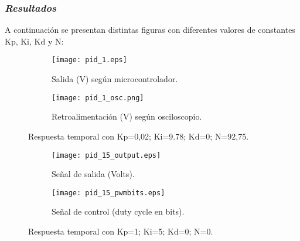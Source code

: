 \subsubsection*{\it{Resultados}}
\vspace{-0.25cm}

A continuación se presentan distintas figuras con diferentes valores de constantes Kp, Ki, Kd y N:

\begin{figure}[H]
    \centering

    \begin{subfigure}[b]{0.49\textwidth}
        \centering
        \texttt{[image: pid\_1.eps]}
        \caption{Salida (V) según microcontrolador.}
        \label{fig:pid1_micro}
    \end{subfigure}
    \begin{subfigure}[b]{0.49\textwidth}
        \centering
        \texttt{[image: pid\_1\_osc.png]}
        \caption{Retroalimentación (V) según osciloscopio.}
        \label{fig:pid_1_osciloscopio}
    \end{subfigure}

    \vspace{-0.25cm}
    \caption{Respuesta temporal con Kp=0,02; Ki=9.78; Kd=0; N=92,75.}
    \label{fig:pid1_osciloscopio}
\end{figure}
\vspace{-0.5cm}

\begin{figure}[H]
    \centering

    \begin{subfigure}[b]{0.49\textwidth}
        \centering
        \texttt{[image: pid\_15\_output.eps]}
        \caption{Señal de salida (Volts).}
        \label{fig:pid_15_output}
    \end{subfigure}
    \begin{subfigure}[b]{0.49\textwidth}
        \centering
        \texttt{[image: pid\_15\_pwmbits.eps]}
        \caption{Señal de control (duty cycle en bits).}
        \label{fig:pid_15_pwm}
    \end{subfigure}

    \vspace{-0.25cm}
    \caption{Respuesta temporal con Kp=1; Ki=5; Kd=0; N=0.}
    \label{fig:pid15_osciloscopio}
\end{figure}
\vspace{-0.5cm}

